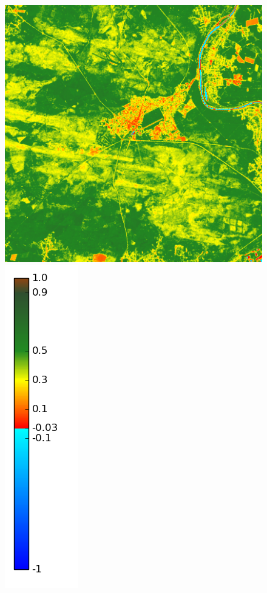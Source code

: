 \documentclass{book}
\begin{document}
\begin{figure}[H]
{\includegraphics[scale=0.2]{images/Fontainebleau/05_ndvi.png}
\includegraphics[scale=0.2]{images/colormap.png}
}
\end{figure}
\end{document}

